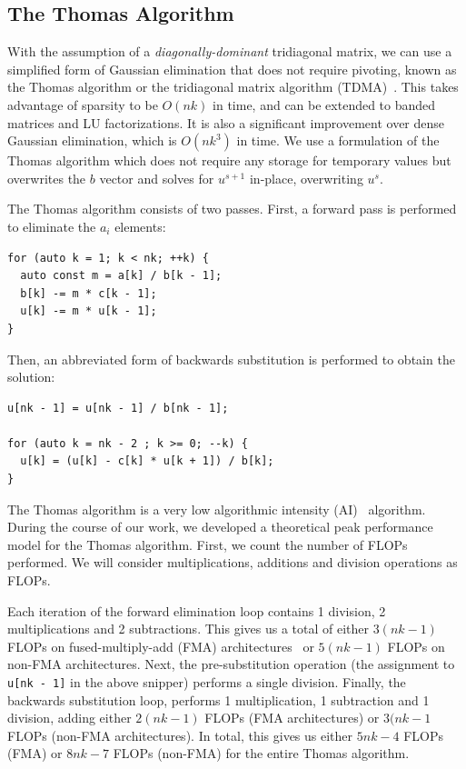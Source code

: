 \documentclass{sig-alternate-05-2015}
\begin{document}
\subsection{The Thomas Algorithm}
\label{sec:implementation:thomas_algorithm}

With the assumption of a \emph{diagonally-dominant} tridiagonal matrix, 
  we can use a simplified
  form of Gaussian elimination that does not require pivoting, known as the
  Thomas algorithm or the tridiagonal matrix algorithm
  (TDMA)~\cite{ConteEtAlElementaryNumericalAnalysis,QuarteroniEtAl2007,TDMA}. 
This takes advantage of sparsity to be \(O(nk)\) in time, 
  and can be extended to banded matrices and LU factorizations.
It is also a significant improvement over dense Gaussian elimination,
  which is \(O(nk^3)\) in time. 
We use a formulation of the Thomas algorithm which does not require any storage
  for temporary values but overwrites the \(b\) vector and solves for \(u^{s+1}\)
  in-place, overwriting \(u^{s}\).

The Thomas algorithm consists of two passes.  First, a forward pass is
  performed to eliminate the \(a_i\) elements:
\begin{lstlisting}
for (auto k = 1; k < nk; ++k) {
  auto const m = a[k] / b[k - 1];
  b[k] -= m * c[k - 1];
  u[k] -= m * u[k - 1];
} 
\end{lstlisting}
Then, an abbreviated form of backwards substitution is performed to obtain the
  solution:
\begin{lstlisting}
u[nk - 1] = u[nk - 1] / b[nk - 1];

for (auto k = nk - 2 ; k >= 0; --k) {
  u[k] = (u[k] - c[k] * u[k + 1]) / b[k];
} 
\end{lstlisting}

The Thomas algorithm is a very low algorithmic intensity (AI)~\cite{roofline}
  algorithm.
During the course of our work, we developed a theoretical peak performance
  model for the Thomas algorithm.
First, we count the number of FLOPs performed.
We will consider multiplications, additions and division operations as FLOPs.

Each iteration of the forward elimination loop contains 1 division, 2
  multiplications and 2 subtractions.
This gives us a total of either \(3(nk-1)\) FLOPs on fused-multiply-add (FMA)
  architectures~\cite{intel_fma_website} or 
  \(5(nk-1)\) FLOPs on non-FMA architectures.
Next, the pre-substitution operation (the assignment to \lstinline{u[nk - 1]}
  in the above snipper) performs a single division.
Finally, the backwards substitution loop, performs 1 multiplication, 1
  subtraction and 1 division, adding either \(2(nk-1)\) FLOPs (FMA architectures)
  or \(3(nk-1\) FLOPs (non-FMA architectures).
In total, this gives us either \(5nk-4\) FLOPs (FMA) or \(8nk-7\) FLOPs
  (non-FMA) for the entire Thomas algorithm.
\end{document}
